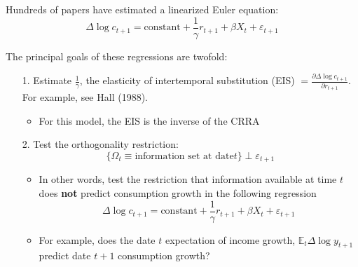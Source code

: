 \documentclass[11pt, aspectratio=169]{beamer}
\newenvironment{witemize}{\itemize\addtolength{\itemsep}{10pt}}{\enditemize}
\begin{document}
\begin{frame}{}

\begin{witemize}
\item Hundreds of papers have estimated a linearized Euler equation: 
\begin{equation*}
	\Delta \log c_{t+1} = \text{constant} + \frac{1}{\gamma} r_{t+1} + \beta
X_t + \varepsilon_{t+1} 
\end{equation*}

\item The principal goals of these regressions are twofold:
\end{witemize}

\vspace{6mm}
\begin{enumerate}
\item [1.] Estimate $\frac{1}{\gamma}$, the elasticity of intertemporal substitution (EIS) $=\frac{\partial \Delta \log c_{t+1}}{\partial r_{t+1} }$. For example, see Hall (1988).

\vspace{3mm}
\begin{itemize}
\item For this model, the EIS is the inverse of the CRRA
\end{itemize}

\end{enumerate}
\end{frame}


\begin{frame}{}

\begin{enumerate}
\item[2.] Test the orthogonality restriction: 
\begin{equation*}
	\Big\{ \Omega_t \equiv \text{information set at date} t \Big\} \perp \varepsilon_{t+1} 
\end{equation*}


\begin{itemize}
\item In other words, test the restriction that information available at time $t$ does \textbf{not} predict consumption growth in the following regression
\begin{equation*}
	\Delta \log c_{t+1} = \text{constant} + \frac{1}{\gamma} r_{t+1} + \beta
X_t + \varepsilon_{t+1}
\end{equation*}

\item For example, does the date $t$ expectation of income growth, $\mathbb E_t\Delta \log y_{t+1}$ predict date $t+1$ consumption growth?
\end{itemize}
\end{enumerate}

\end{frame}
\end{document}

